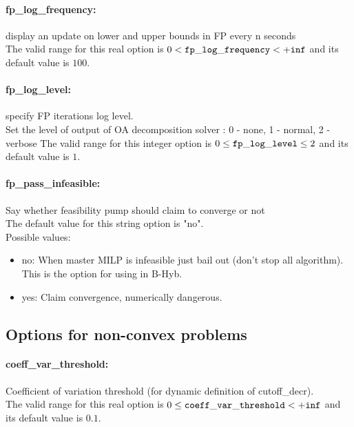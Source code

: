 \paragraph{fp\_log\_frequency:}\label{sec:fp_log_frequency} display an update on lower and upper bounds in FP every n seconds $\;$ \\
 The valid range for this real option is 
$0 <  {\tt fp\_log\_frequency } <  {\tt +inf}$
and its default value is $100$.


\paragraph{fp\_log\_level:}\label{sec:fp_log_level} specify FP iterations log level. $\;$ \\
 Set the level of output of OA decomposition
solver : 0 - none, 1 - normal, 2 - verbose The valid range for this integer option is
$0 \le {\tt fp\_log\_level } \le 2$
and its default value is $1$.


\paragraph{fp\_pass\_infeasible:}\label{sec:fp_pass_infeasible} Say whether feasibility pump should claim to converge or not $\;$ \\

The default value for this string option is "no".
\\ 
Possible values:
\begin{itemize}
   \item no: When master MILP is infeasible just bail out
(don't stop all algorithm). This is the option
for using in B-Hyb.
   \item yes: Claim convergence, numerically dangerous.
\end{itemize}

\subsection{Options for non-convex problems}
\label{sec:Options_for_non-convex_problems}
\paragraph{coeff\_var\_threshold:}\label{sec:coeff_var_threshold} Coefficient of variation threshold (for dynamic definition of cutoff\_decr). $\;$ \\
 The valid range for this real option is 
$0 \le {\tt coeff\_var\_threshold } <  {\tt +inf}$
and its default value is $0.1$.


